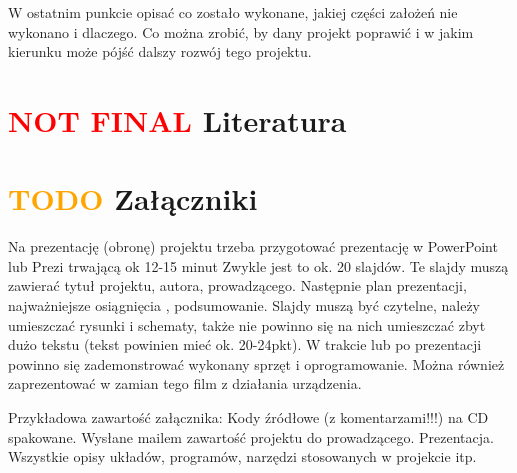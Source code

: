 \documentclass[11pt,titlepage]{article}
\begin{document}
W ostatnim punkcie opisać co zostało wykonane, jakiej części założeń nie wykonano i dlaczego. Co można zrobić, by dany projekt poprawić i w jakim kierunku może pójść dalszy rozwój tego projektu.

\newpage

\section{\textcolor{red}{NOT FINAL}  Literatura}

\printbibliography[heading=none]

\newpage

\section{\textcolor{orange}{TODO} Załączniki}

Na prezentację (obronę) projektu trzeba przygotować prezentację w PowerPoint lub Prezi trwającą ok 12-15 minut Zwykle jest to ok. 20 slajdów. Te slajdy muszą zawierać tytuł projektu, autora, prowadzącego. Następnie plan prezentacji, najważniejsze osiągnięcia , podsumowanie. Slajdy muszą być czytelne, należy umieszczać rysunki i schematy, także nie powinno się na nich umieszczać zbyt dużo tekstu (tekst powinien mieć ok. 20-24pkt). W trakcie lub po prezentacji powinno się zademonstrować wykonany sprzęt i oprogramowanie. Można również zaprezentować w zamian tego film z działania urządzenia.

Przykładowa zawartość załącznika:
Kody źródłowe (z komentarzami!!!) na CD spakowane.
Wysłane mailem zawartość projektu do prowadzącego.
Prezentacja.
Wszystkie opisy układów, programów, narzędzi stosowanych w projekcie itp.
\end{document}
